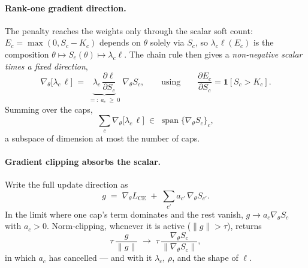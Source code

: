 \documentclass[10pt]{article}
\begin{document}
{\paragraph{Rank-one gradient direction.}
The penalty reaches the weights only through the scalar soft count:
$E_c=\max(0,S_c-K_c)$ depends on $\theta$ solely via $S_c$, so
$\lambda_c\ell(E_c)$ is the composition
$\theta\mapsto S_c(\theta)\mapsto\lambda_c\ell$. The chain rule then gives a
\emph{non-negative scalar times a fixed direction},
\[
\nabla_\theta\bigl[\lambda_c\,\ell\bigr]
\;=\;
\underbrace{\lambda_c\,\frac{\partial\ell}{\partial S_c}}_{=:\;a_c\;\ge\;0}
\;\nabla_\theta S_c ,
\qquad\text{using}\qquad
\frac{\partial E_c}{\partial S_c}=\mathbf 1[S_c>K_c] .
\]
Summing over the caps,
\[
\sum_c \nabla_\theta\bigl[\lambda_c\,\ell\bigr]
\;\in\;
\operatorname{span}\{\nabla_\theta S_c\}_c ,
\]
a subspace of dimension at most the number of caps.
}

{\paragraph{Gradient clipping absorbs the scalar.}
Write the full update direction as
\[
g \;=\; \nabla_\theta L_{\text{CE}} \;+\; \sum_{c'} a_{c'}\,\nabla_\theta S_{c'} .
\]
In the limit where one cap's term dominates and the rest vanish, $g\to a_c\nabla_\theta S_c$
with $a_c>0$. Norm-clipping, whenever it is active ($\lVert g\rVert>\tau$), returns
\[
\tau\,\frac{g}{\lVert g\rVert}
\;\longrightarrow\;
\tau\,\frac{\nabla_\theta S_c}{\lVert\nabla_\theta S_c\rVert},
\]
in which $a_c$ has cancelled --- and with it $\lambda_c$, $\rho$, and the shape of $\ell$.
}
\end{document}

